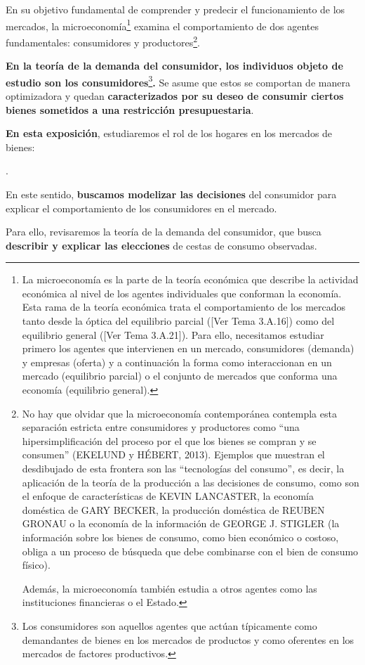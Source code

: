 \documentclass[10pt,a4paper]{article}
\newcounter{numitem}
\newenvironment{lnum}
      {\begin{list}{\arabic{numitem}.}{%
          \usecounter{numitem}%
          \setlength{\leftmargin}{1cm}%
          \setlength{\parskip}{3pt}%
          \setlength{\itemsep}{0pt}%
          \setlength{\parsep}{0pt}%
      }}
      {\end{list}}
\newcommand{\authorfont}[1]{{\fontfamily{EBGaramond-TLF}\selectfont #1}}
\begin{document}
En su objetivo fundamental de comprender y predecir el funcionamiento de los mercados, la microeconomía\footnote{%
    La microeconomía es la parte de la teoría económica que describe la actividad económica al nivel de los agentes individuales que conforman la economía. Esta rama de la teoría económica trata el comportamiento de los mercados tanto desde la óptica del equilibrio parcial ([\authorfont{Ver Tema 3.A.16}]) como del equilibrio general ([\authorfont{Ver Tema 3.A.21}]). Para ello, necesitamos estudiar primero los agentes que intervienen en un mercado, consumidores (demanda) y empresas (oferta) y a continuación la forma como interaccionan en un mercado (equilibrio parcial) o el conjunto de mercados que conforma una economía (equilibrio general).
} examina el comportamiento de dos agentes fundamentales: consumidores y productores\footnote{%
    No hay que olvidar que la microeconomía contemporánea contempla esta separación estricta entre consumidores y productores como ``una hipersimplificación del proceso por el que los bienes se compran y se consumen'' (EKELUND y HÉBERT, 2013). Ejemplos que muestran el desdibujado de esta frontera son las ``tecnologías del consumo'', es decir, la aplicación de la teoría de la producción a las decisiones de consumo, como son el enfoque de características de KEVIN LANCASTER, la economía doméstica de GARY BECKER, la producción doméstica de REUBEN GRONAU o la economía de la información de GEORGE J. STIGLER (la información sobre los bienes de consumo, como bien económico o costoso, obliga a un proceso de búsqueda que debe combinarse con el bien de consumo físico).

    Además, la microeconomía también estudia a otros agentes como las instituciones financieras o el Estado.
}.

\textbf{En la teoría de la demanda del consumidor, los individuos objeto de estudio son los consumidores}\footnote{%
    Los consumidores son aquellos agentes que actúan típicamente como demandantes de bienes en los mercados de productos y como oferentes en los mercados de factores productivos.
}\textbf{.} Se asume que estos se comportan de manera optimizadora y quedan \textbf{caracterizados por su deseo de consumir ciertos bienes sometidos a una restricción presupuestaria}.

\textbf{En esta exposición}, estudiaremos el rol de los hogares en los mercados de bienes:

\begin{lnum}
    \item En este sentido, \textbf{buscamos modelizar las decisiones} del consumidor para explicar el comportamiento de los consumidores en el mercado.
    \item Para ello, revisaremos la teoría de la demanda del consumidor, que busca \textbf{describir y explicar las elecciones} de cestas de consumo observadas.
\end{lnum}
\end{document}
